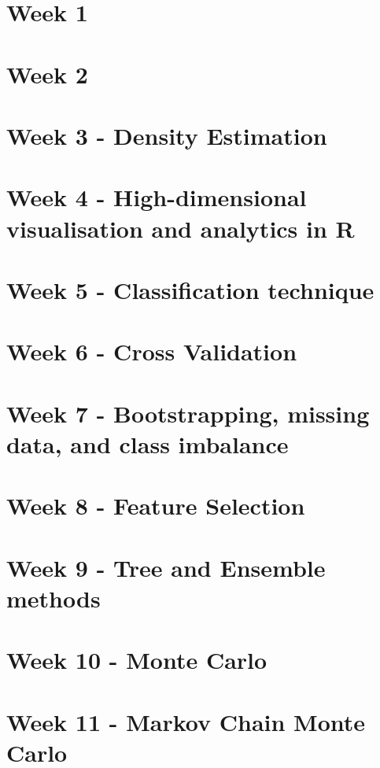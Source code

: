 \documentclass[12pt]{article}
\begin{document}



\pagebreak

\section{Week 1}

\pagebreak

\section{Week 2}

\pagebreak

\section{Week 3 - Density Estimation}

\pagebreak

\section{Week 4 - High-dimensional visualisation and analytics in R}

\pagebreak

\section{Week 5 - Classification technique}

\pagebreak

\section{Week 6 - Cross Validation}

\pagebreak

\section{Week 7 - Bootstrapping, missing data, and class imbalance}

\pagebreak

\section{Week 8 - Feature Selection}

\pagebreak

\section{Week 9 - Tree and Ensemble methods}

\pagebreak

\section{Week 10 - Monte Carlo}

\pagebreak

\section{Week 11 - Markov Chain Monte Carlo}

\pagebreak
\end{document}
